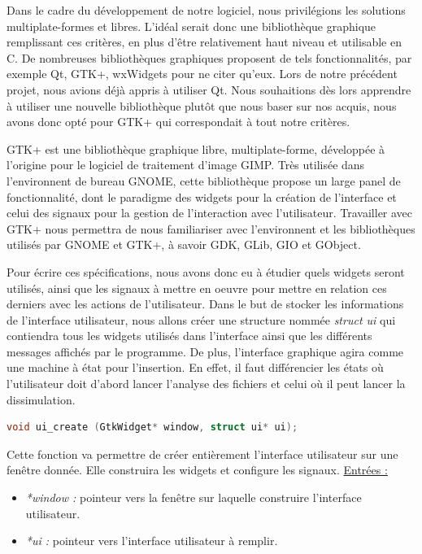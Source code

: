 \documentclass[11pt]{article}
\begin{document}
Dans le cadre du développement de notre logiciel, nous privilégions les
solutions multiplate-formes et libres. L'idéal serait donc une bibliothèque
graphique remplissant ces critères, en plus d'être relativement haut niveau et
utilisable en C. De nombreuses bibliothèques graphiques proposent de tels
fonctionnalités, par exemple Qt, GTK+, wxWidgets pour ne citer qu'eux. Lors de
notre précédent projet, nous avions déjà appris à utiliser Qt. Nous souhaitions
dès lors apprendre à utiliser une nouvelle bibliothèque plutôt que nous baser
sur nos acquis, nous avons donc opté pour GTK+ qui correspondait à tout notre
critères.

GTK+ est une bibliothèque graphique libre, multiplate-forme, développée à
l'origine pour le logiciel de traitement d'image GIMP. Très utilisée dans
l'environnent de bureau GNOME, cette bibliothèque propose un large panel de
fonctionnalité, dont le paradigme des widgets pour la création de l'interface et
celui des signaux pour la gestion de l'interaction avec l'utilisateur.
Travailler avec GTK+ nous permettra de nous familiariser avec l'environnent et
les bibliothèques utilisés par GNOME et GTK+, à savoir GDK, GLib, GIO et
GObject.

Pour écrire ces spécifications, nous avons donc eu à étudier quels widgets
seront utilisés, ainsi que les signaux à mettre en oeuvre pour mettre en
relation ces derniers avec les actions de l'utilisateur. Dans le but de stocker
les informations de l'interface utilisateur, nous allons créer une structure
nommée \textit{struct ui} qui contiendra tous les widgets utilisés dans
l'interface ainsi que les différents messages affichés par le programme. De
plus, l’interface graphique agira comme une machine à état pour l’insertion. En
effet, il faut différencier les états où l’utilisateur doit d’abord lancer
l’analyse des fichiers et celui où il peut lancer la dissimulation.

\begin{lstlisting}[language=c]
void ui_create (GtkWidget* window, struct ui* ui);
\end{lstlisting}

Cette fonction va permettre de créer entièrement l'interface utilisateur 
sur une fenêtre donnée. Elle construira les widgets et configure les signaux. 
\newline
\underline{Entrées :} 
\begin{itemize}
\item \textit{*window :} pointeur vers la fenêtre sur laquelle construire 
l'interface utilisateur. 
\item \textit{*ui :} pointeur vers l'interface utilisateur à remplir. 
\newline 
\end{itemize}
\end{document}
